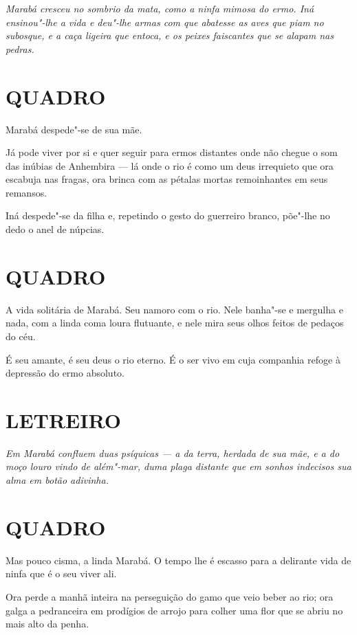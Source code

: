 \emph{Marabá cresceu no sombrio da mata, como a ninfa mimosa do ermo.
Iná ensinou"-lhe a vida e deu"-lhe armas com que abatesse as aves que piam
no subosque, e a caça ligeira que entoca, e os peixes faiscantes que se
alapam nas pedras.}

\section*{QUADRO}

Marabá despede"-se de sua mãe.

Já pode viver por si e quer seguir para ermos distantes onde não chegue
o som das inúbias de Anhembira --- lá onde o rio é como um deus
irrequieto que ora escabuja nas fragas, ora brinca com as pétalas mortas
remoinhantes em seus remansos.

Iná despede"-se da filha e, repetindo o gesto do guerreiro branco,
põe"-lhe no dedo o anel de núpcias.

\section*{QUADRO}

A vida solitária de Marabá. Seu namoro com o rio. Nele banha"-se e
mergulha e nada, com a linda coma loura flutuante, e nele mira seus
olhos feitos de pedaços do céu.

É seu amante, é seu deus o rio eterno. É o ser vivo em cuja companhia
refoge à depressão do ermo absoluto.

\section*{LETREIRO}

\emph{Em Marabá confluem duas psíquicas --- a da terra, herdada de sua
mãe, e a do moço louro vindo de além"-mar, duma plaga distante que em
sonhos indecisos sua alma em botão adivinha.}

\section*{QUADRO}

Mas pouco cisma, a linda Marabá. O tempo lhe é escasso para a delirante
vida de ninfa que é o seu viver ali.

Ora perde a manhã inteira na perseguição do gamo que veio beber ao rio;
ora galga a pedranceira em prodígios de arrojo para colher uma flor que
se abriu no mais alto da penha.


